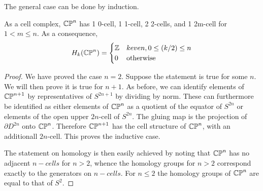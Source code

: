 The general case can be done by induction.

\begin{theorem}
As a cell complex, $\mathbb{CP}^{n}$ has 1 0-cell, 1 1-cell, 2 2-cells, and 1 2m-cell for $1<m\leq n$. As a consequence,
$$H_k(\mathbb{CP}^{n})=\begin{cases} 
      \mathbb{Z} & k even, 0\leq (k/2)\leq n \\
      0 & \text{otherwise}
   \end{cases}
$$
\end{theorem}
\begin{proof}
We have proved the case $n=2$. Suppose the statement is true for some $n$. We will then prove it is true for $n+1$. As before, we can identify elements of $\mathbb{CP}^{n+1}$ by representatives of $S^{2n+1}$ by dividing by norm. These can furthermore be identified as either elements of $\mathbb{CP}^{n}$ as a quotient of the equator of $S^{2n}$ or elements of the open upper $2n$-cell of $S^{2n}$. The gluing map is the projection of $\partial D^{2n}$ onto $\mathbb{CP}^{n}$. Therefore $\mathbb{CP}^{n+1}$ has the cell structure of $\mathbb{CP}^{n}$, with an additionall $2n$-cell. This proves the inductive case.

The statement on homology is then easily achieved by noting that $\mathbb{CP}^{n}$ has no adjacent $n-cells$ for $n>2$, whence the homology groups for $n>2$ correspond exactly to the generators on $n-cells$. For $n\leq 2$ the homology groups of $\mathbb{CP}^{n}$ are equal to that of $S^2$.
\end{proof}